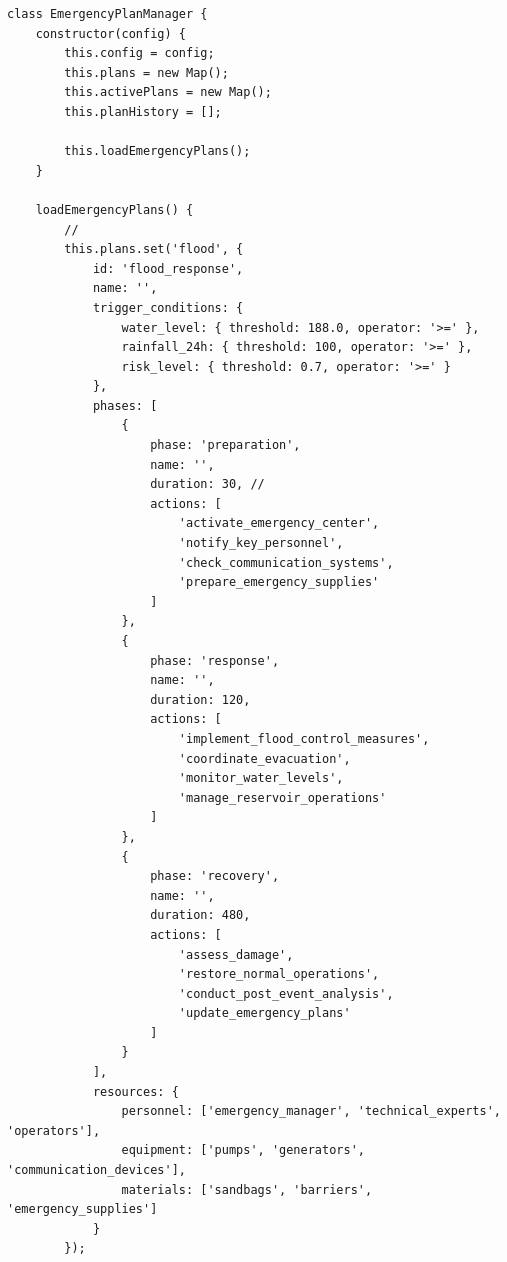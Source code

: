 \begin{lstlisting}[style=javascript]
class EmergencyPlanManager {
    constructor(config) {
        this.config = config;
        this.plans = new Map();
        this.activePlans = new Map();
        this.planHistory = [];
        
        this.loadEmergencyPlans();
    }
    
    loadEmergencyPlans() {
        // 
        this.plans.set('flood', {
            id: 'flood_response',
            name: '',
            trigger_conditions: {
                water_level: { threshold: 188.0, operator: '>=' },
                rainfall_24h: { threshold: 100, operator: '>=' },
                risk_level: { threshold: 0.7, operator: '>=' }
            },
            phases: [
                {
                    phase: 'preparation',
                    name: '',
                    duration: 30, // 
                    actions: [
                        'activate_emergency_center',
                        'notify_key_personnel',
                        'check_communication_systems',
                        'prepare_emergency_supplies'
                    ]
                },
                {
                    phase: 'response',
                    name: '',
                    duration: 120,
                    actions: [
                        'implement_flood_control_measures',
                        'coordinate_evacuation',
                        'monitor_water_levels',
                        'manage_reservoir_operations'
                    ]
                },
                {
                    phase: 'recovery',
                    name: '',
                    duration: 480,
                    actions: [
                        'assess_damage',
                        'restore_normal_operations',
                        'conduct_post_event_analysis',
                        'update_emergency_plans'
                    ]
                }
            ],
            resources: {
                personnel: ['emergency_manager', 'technical_experts', 'operators'],
                equipment: ['pumps', 'generators', 'communication_devices'],
                materials: ['sandbags', 'barriers', 'emergency_supplies']
            }
        });
        

\end{lstlisting}
